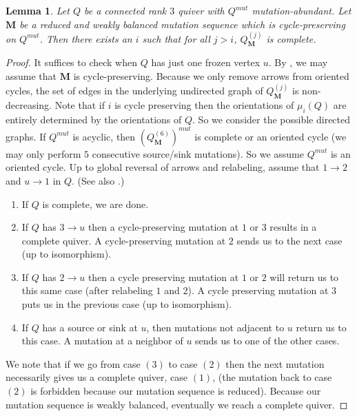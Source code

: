 \documentclass[12pt]{amsart}
\newtheorem{lem}[thm]{Lemma}
\theoremstyle{definition}
\theoremstyle{remark}
\numberwithin{equation}{section}
\begin{document}
\begin{lem}
\label{lem: complete tail}
Let $Q$ be a connected rank $3$ quiver with $Q^{mut}$ mutation-abundant.
Let $\mathbf M$ be a reduced and weakly balanced mutation sequence which is cycle-preserving on $Q^{mut}$. 
Then there exists an $i$ such that for all $j>i$, $Q^{(j)}_{\mathbf M}$ is complete.
\end{lem}
\begin{proof}
It suffices to check when $Q$ has just one frozen vertex $u$.
By , we may assume that $\mathbf M$ is cycle-preserving.
Because we only remove arrows from oriented cycles, the set of edges in the underlying undirected graph of $Q^{(j)}_{\mathbf M}$ is non-decreasing.
Note that if $i$ is cycle preserving then the orientations of $\mu_i(Q)$ are entirely determined by the orientations of $Q$. 
So we consider the possible directed graphs. 
If $Q^{mut}$ is acyclic, then  $(Q^{(6)}_{\mathbf{M}})^{mut}$ is complete or an oriented cycle (we may only perform $5$ consecutive source/sink mutations). %
So we assume $Q^{mut}$ is an oriented cycle.
Up to global reversal of arrows and relabeling, assume that $1 \rightarrow 2$ and $u \rightarrow 1$ in $Q$. (See also .)
\begin{enumerate}
\item 
If $Q$ is complete, we are done.
\item 
If $Q$ has $3 \rightarrow u$ then a cycle-preserving mutation at $1$ or $3$ results in a complete quiver. A cycle-preserving mutation at $2$ sends us to the next case (up to isomorphism).
\item 
If $Q$ has $2 \rightarrow u$ then a cycle preserving mutation at $1$ or $2$ will return us to this same case (after relabeling $1$ and $2$). A cycle preserving mutation at $3$ puts us in the previous case (up to isomorphism).
\item 
If $Q$ has a source or sink at $u$, then mutations not adjacent to $u$ return us to this case. A mutation at a neighbor of $u$ sends us to one of the other cases.
\end{enumerate}
We note that if we go from case $(3)$ to case $(2)$ then the next mutation necessarily gives us a complete quiver, case $(1)$, (the mutation back to case $(2)$ is forbidden because our mutation sequence is reduced). 
Because our mutation sequence is weakly balanced, eventually we reach a complete quiver.
\end{proof}
\end{document}

